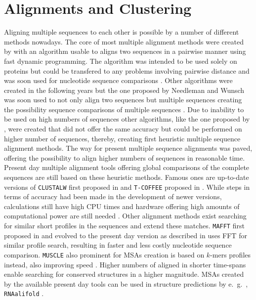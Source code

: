 \section{Alignments and Clustering}

Aligning multiple sequences to each other is possible by a number of different methods nowadays. The core of most multiple alignment methods were created by \textcite{needleman_general_1970} with an algorithm usable to aligns two sequences in a pairwise manner using fast dynamic programming. The algorithm was intended to be used solely on proteins but could be transfered to any problems involving pairwise distance and was soon used for nucleotide sequence comparisons \autocite{phillips_multiple_2000}. Other algorithms were created in the following years but the one proposed by Needleman and Wunsch was soon used to not only align two sequences but multiple sequences creating the possibility sequence comparisons of multiple sequences \autocite{phillips_multiple_2000}. Due to inability to be used on high numbers of sequences other algorithms, like the one proposed by \textcite{feng_progressive_1987}, were created that did not offer the same accuracy but could be performed on higher number of sequences, thereby, creating first heuristic multiple sequence alignment methods. The way for present multiple sequence alignments was paved, offering the possibility to align higher numbers of sequences in reasonable time. Present day multiple alignment tools offering global comparisons of the complete sequences are still based on these heuristic methods. Famous ones are up-to-date versions of \texttt{CLUSTALW} first proposed in \textcite{thompson_clustal_1994} and \texttt{T-COFFEE} proposed in \textcite{notredame_t-coffee_2000}. While steps in terms of accuracy had been made in the development of newer versions, calculations still have high CPU times and hardware offering high amounts of computational power are still needed \autocite{katoh_mafft_2002}. Other alignment methods exist searching for similar short profiles in the sequences and extend these matches. \texttt{MAFFT} first proposed in \textcite{katoh_mafft_2002} and evolved to the present day version as described in \textcite{katoh_mafft_2013} uses \gls{FFT} for similar profile search, resulting in faster and less costly nucleotide sequence comparison. \texttt{MUSCLE} also prominent for \glspl{MSA} creation is based on $k$-mers profiles instead, also improving speed \autocite{edgar_muscle_2004}. Higher numbers of aligned in shorter time-spans enable searching for conserved structures in a higher magnitude. \glspl{MSA} created by the available present day tools can be used in structure predictions by e.~g.~, \texttt{RNAalifold} \autocite{bernhart_rnaalifold_2008}.

